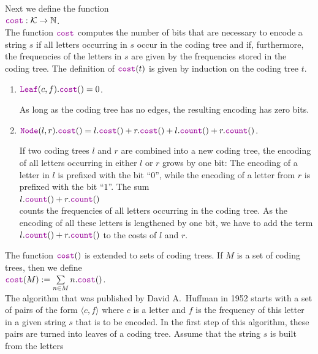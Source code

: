Next we define the function
\\[0.2cm]
\hspace*{1.3cm}
$\mytt{cost}: \mathcal{K} \rightarrow \N$.
\\[0.2cm]
The function $\mytt{cost}$ computes the number of bits that are necessary to encode a string $s$ if 
all letters occurring in $s$ occur in the coding tree and if, furthermore, the frequencies of the letters
in $s$ are given by the frequencies stored in the coding tree.
The definition of $\mytt{cost}(t)$ is given by induction on the coding tree $t$.
\begin{enumerate}
\item $\mytt{Leaf}(c,f).\mytt{cost}() = 0$.

      As long as the coding tree has no edges, the resulting encoding has zero bits.
\item $\mytt{Node}(l,r).\mytt{cost}() = 
       l.\mytt{cost}() + r.\mytt{cost}() + l.\mytt{count}() + r.\mytt{count}()$.

      If two coding trees $l$ and $r$ are combined into a new coding tree, the encoding of all letters
      occurring in either $l$ or $r$ grows by one bit:  The encoding of a letter in $l$ is prefixed with the
      bit ``$0$'', while the encoding of a letter from $r$ is prefixed with the bit ``$1$''.  The sum
      \\[0.2cm]
      \hspace*{1.3cm}
      $l.\mytt{count}() + r.\mytt{count}()$
      \\[0.2cm] 
      counts the frequencies of all letters occurring in the coding tree.
      As the encoding of all these letters is lengthened by one bit,
      we have to add the term $l.\mytt{count}() + r.\mytt{count}()$ to the costs of $l$ and $r$.
\end{enumerate}
The function  $\mytt{cost}()$ is extended to sets of coding trees.  If $M$ is a set of coding trees, then we
define
\\[0.2cm]
\hspace*{1.3cm}
$\mytt{cost}(M) := \sum\limits_{n\in M} n.\mytt{cost}()$. 
\\[0.2cm]
The algorithm that was published by David A.~Huffman in 1952 \cite{huffman:52} starts with a set of pairs of
the form $\langle c, f\rangle$ where $c$ is a letter and $f$ is the frequency of this letter in a given string
$s$ that is to be encoded.  In the first step of this algorithm, these pairs are turned into leaves of a coding tree.
Assume that the string $s$ is built from the  letters
